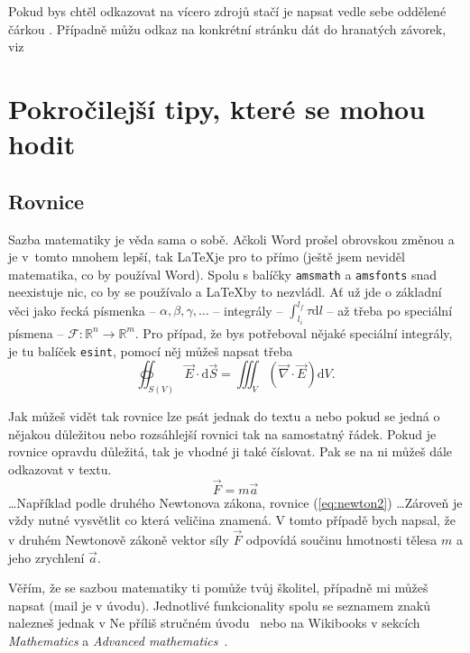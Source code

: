 \documentclass[12pt, a4paper,
 twoside,        %
 openright
]{report}
\newcommand{\dif}{\mathrm{d}} %
\begin{document}
Pokud bys chtěl odkazovat na vícero zdrojů stačí je napsat vedle sebe oddělené čárkou \cite{LaTeXprirucka, citacePRO, Born2019}. Případně můžu odkaz na konkrétní stránku dát do hranatých závorek, viz \cite[str.~1]{Born2019}


\section[Pokročilejší tipy]{Pokročilejší tipy, které se mohou hodit}

\subsection{Rovnice}

Sazba matematiky je věda sama o sobě. Ačkoli Word prošel obrovskou změnou a je v~tomto mnohem lepší, tak \LaTeX je pro to přímo (ještě jsem neviděl matematika, co by používal Word). Spolu s balíčky \texttt{amsmath} a \texttt{amsfonts} snad neexistuje nic, co by se používalo a \LaTeX by to nezvládl. Ať už jde o základní věci jako řecká písmenka -- $\alpha, \beta, \gamma, \dots$ -- integrály -- $\int_{l_i}^{l_f} \tau \dif l $ -- až třeba po speciální písmena -- $\mathscr{F}: \mathbb{R}^n \to \mathbb{R}^m$. Pro případ, že bys potřeboval nějaké speciální integrály, je tu balíček \texttt{esint}, pomocí něj můžeš napsat třeba
$$ \oiint_{S(V)} \vec{E} \cdot \dif \vec{S} = \iiint_{V} \left(\vec{\nabla} \cdot \vec{E}\right) \dif V .$$

Jak můžeš vidět tak rovnice lze psát jednak do textu a nebo pokud se jedná o nějakou důležitou nebo rozsáhlejší rovnici tak na samostatný řádek. Pokud je rovnice opravdu důležitá, tak je vhodné ji také číslovat. Pak se na ni můžeš dále odkazovat v textu.
\begin{equation}
    \vec{F} = m \vec{a}
    \label{eq:newton2}
\end{equation}
\dots Například podle druhého Newtonova zákona, rovnice (\ref{eq:newton2}) \dots Zároveň je vždy nutné vysvětlit co která veličina znamená. V tomto případě bych napsal, že v druhém Newtonově zákoně vektor síly $\vec F$ odpovídá součinu hmotnosti tělesa $m$ a jeho zrychlení $\vec a$. 

Věřím, že se sazbou matematiky ti pomůže tvůj školitel, případně mi můžeš napsat (mail je v úvodu). Jednotlivé funkcionality spolu se seznamem znaků nalezneš jednak v Ne příliš stručném úvodu~\cite{LaTeXprirucka} nebo na Wikibooks v sekcích \emph{Mathematics} a \emph{Advanced mathematics}~\cite{wikibooksLaTeX}.
\end{document}
